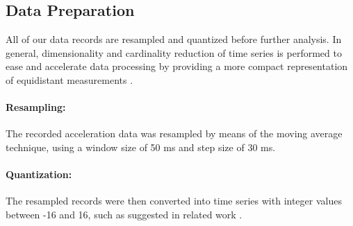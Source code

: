 \subsection{Data Preparation} \label{data_preparation}

All of our data records are resampled and quantized before further analysis. In general, dimensionality and cardinality reduction of time series is performed to ease and accelerate data processing by providing a more compact representation of equidistant measurements \cite{liu2009uwave}.

\paragraph{Resampling:} The recorded acceleration data was resampled by means of the moving average technique, using a window size of 50 ms and step size of 30 ms.

\paragraph{Quantization:} The resampled records were then converted into time series with integer values between -16 and 16, such as suggested in related work \cite{liu2009uwave}.
